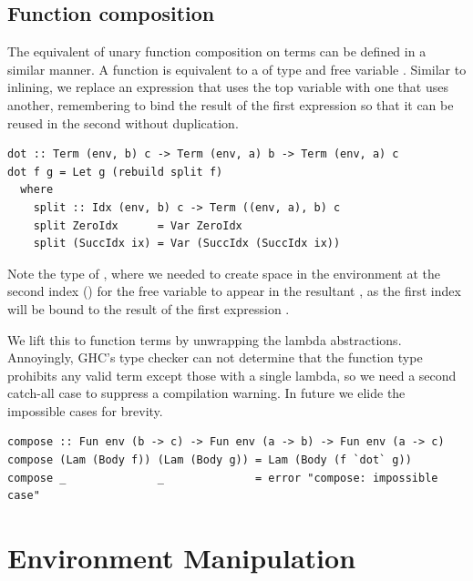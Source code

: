 
\subsection{Function composition}
\label{sec:function_composition}

The equivalent of unary function composition  on terms can be
defined in a similar manner. A function  is equivalent to a
 of type  and free variable . Similar to inlining, we
replace an expression that uses the top variable with one that uses another,
remembering to bind the result of the first expression so that it can be reused
in the second without duplication.
%
\begin{lstlisting}[style=haskell]
dot :: Term (env, b) c -> Term (env, a) b -> Term (env, a) c
dot f g = Let g (rebuild split f)
  where
    split :: Idx (env, b) c -> Term ((env, a), b) c
    split ZeroIdx      = Var ZeroIdx
    split (SuccIdx ix) = Var (SuccIdx (SuccIdx ix))
\end{lstlisting}
%
Note the type of , where we needed to create space in the
environment at the second index () for the free variable
 to appear in the resultant , as the first index will be
bound to the result of the first expression .

We lift this to function terms by unwrapping the lambda abstractions.
Annoyingly, GHC's type checker can not determine that the function type
prohibits any valid term except those with a single lambda, so we need a second
catch-all case to suppress a compilation warning. In future we elide the
impossible cases for brevity.
%
\begin{lstlisting}[style=haskell,firstnumber=last,caption={A simultaneous substitution to compose unary function terms}]
compose :: Fun env (b -> c) -> Fun env (a -> b) -> Fun env (a -> c)
compose (Lam (Body f)) (Lam (Body g)) = Lam (Body (f `dot` g))
compose _              _              = error "compose: impossible case"
\end{lstlisting}


\section{Environment Manipulation}
\label{sec:environment_manipulation}

